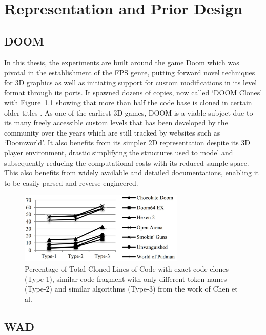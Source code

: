 \documentclass{Configuration_Files/PoliMi3i_thesis}
\begin{document}
\chapter{Representation and Prior Design}
\label{ch:representation and prior design}%

\section{DOOM}
In this thesis, the experiments are built around the game Doom \cite{IdS93} which was pivotal in 
the establishment of the FPS genre, putting forward novel techniques for 3D graphics as well as 
initiating support for custom modifications in its level format through its ports. It spawned 
dozens of copies, now called  ‘DOOM Clones’ with Figure~\ref{fig:doomclones} showing that more 
than half the code base is cloned in certain older titles \cite{YaC14}. As one of the earliest 3D games, 
DOOM is a viable subject due to its many freely accessible custom levels that has been developed by 
the community over the years which are still tracked by websites such as ‘Doomworld’. It also benefits 
from its simpler 2D representation despite its 3D player environment, drastic simplifying the structures used to model 
and subsequently reducing the computational costs with its reduced sample space. This also benefits 
from widely available and detailed documentations, enabling it to be easily parsed and reverse engineered.
\begin{figure}[H]
    \centering
    \includegraphics[width=0.7\textwidth]{doom_clones.jpg}
    \caption[Cloned lines of code for C-based from the work of Chen et al.]{Percentage of Total Cloned Lines of Code with exact code clones (Type-1), similar code fragment with only different token names (Type-2) and similar algorithms (Type-3) from the work of Chen et al.}
    \label{fig:doomclones}
\end{figure}

\section{WAD}
\end{document}
